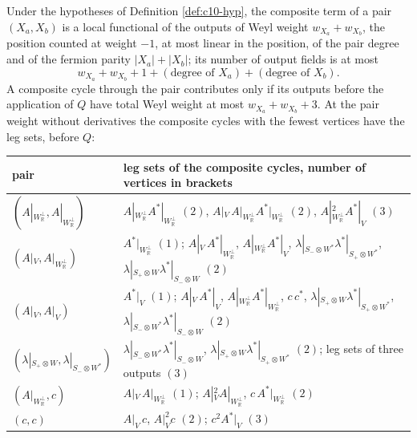 \begin{proposition}
\label{prop:c10-compbound}
Under the hypotheses of Definition \ref{def:c10-hyp}, the composite term of a pair $(X_a,X_b)$ is a local functional of the outputs of Weyl weight $w_{X_a}+w_{X_b}$, the position counted at weight $-1$, at most linear in the position, of the pair degree and of the fermion parity $|X_a|+|X_b|$; its number of output fields is at most
\[
w_{X_a}+w_{X_b}+1+(\text{degree of }X_a)+(\text{degree of }X_b).
\]
A composite cycle through the pair contributes only if its outputs before the application of $Q$ have total Weyl weight at most $w_{X_a}+w_{X_b}+3$. At the pair weight without derivatives the composite cycles with the fewest vertices have the leg sets, before $Q$:

\begin{tabular}{l|l}
pair & leg sets of the composite cycles, number of vertices in brackets\\
\hline
$(A|_{W_{\mathbb R}^\perp},A|_{W_{\mathbb R}^\perp})$ & $A|_{W_{\mathbb R}^\perp}A^*|_{W_{\mathbb R}^\perp}$ $(2)$, $A|_V\,A|_{W_{\mathbb R}^\perp}A^*|_{W_{\mathbb R}^\perp}$ $(2)$, $A|_{W_{\mathbb R}^\perp}^2A^*|_V$ $(3)$\\
$(A|_V,A|_{W_{\mathbb R}^\perp})$ & $A^*|_{W_{\mathbb R}^\perp}$ $(1)$; $A|_V\,A^*|_{W_{\mathbb R}^\perp}$, $A|_{W_{\mathbb R}^\perp}A^*|_V$, $\lambda|_{S_-\otimes W^*}\lambda^*|_{S_+\otimes W^*}$, $\lambda|_{S_+\otimes W}\lambda^*|_{S_-\otimes W}$ $(2)$\\
$(A|_V,A|_V)$ & $A^*|_V$ $(1)$; $A|_V\,A^*|_V$, $A|_{W_{\mathbb R}^\perp}A^*|_{W_{\mathbb R}^\perp}$, $c\,c^*$, $\lambda|_{S_+\otimes W}\lambda^*|_{S_+\otimes W^*}$, $\lambda|_{S_-\otimes W^*}\lambda^*|_{S_-\otimes W}$ $(2)$\\
$(\lambda|_{S_+\otimes W},\lambda|_{S_-\otimes W^*})$ & $\lambda|_{S_-\otimes W^*}\lambda^*|_{S_-\otimes W}$, $\lambda|_{S_+\otimes W}\lambda^*|_{S_+\otimes W^*}$ $(2)$; leg sets of three outputs $(3)$\\
$(A|_{W_{\mathbb R}^\perp},c)$ & $A|_V\,A|_{W_{\mathbb R}^\perp}$ $(1)$; $A|_V^2A|_{W_{\mathbb R}^\perp}$, $c\,A^*|_{W_{\mathbb R}^\perp}$ $(2)$\\
$(c,c)$ & $A|_V\,c$, $A|_V^2c$ $(2)$; $c^2A^*|_V$ $(3)$\\
\end{tabular}
\end{proposition}


